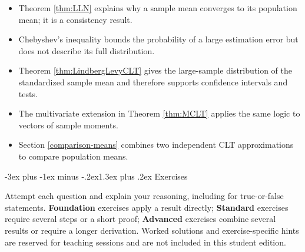 \documentclass[
  11pt,
]{book}
\makeatletter
\providecommand{\tightlist}{%
  \setlength{\itemsep}{0pt}\setlength{\parskip}{0pt}}
\renewcommand\section{\@startsection{section}{1}{\z@}
  {-3ex plus -1ex minus -.2ex}{1.3ex plus .2ex}
  {\normalfont\Large\bfseries\color{TextbookInk}}}
\theoremstyle{definition}
\theoremstyle{definition}
\theoremstyle{definition}
\theoremstyle{definition}
\theoremstyle{remark}
\makeatother
\begin{document}
\begin{recapbox}

\begin{itemize}
\tightlist
\item
  Theorem \ref{thm:LLN} explains why a sample mean converges to its population mean; it is a consistency result.
\item
  Chebyshev's inequality bounds the probability of a large estimation error but does not describe its full distribution.
\item
  Theorem \ref{thm:LindbergLevyCLT} gives the large-sample distribution of the standardized sample mean and therefore supports confidence intervals and tests.
\item
  The multivariate extension in Theorem \ref{thm:MCLT} applies the same logic to vectors of sample moments.
\item
  Section \ref{comparison-means} combines two independent CLT approximations to compare population means.
\end{itemize}

\end{recapbox}

\clearpage

\section{Exercises}\label{clt-exercises}

Attempt each question and explain your reasoning, including for true-or-false statements. \textbf{Foundation} exercises apply a result directly; \textbf{Standard} exercises require several steps or a short proof; \textbf{Advanced} exercises combine several results or require a longer derivation. Worked solutions and exercise-specific hints are reserved for teaching sessions and are not included in this student edition.

\end{document}
